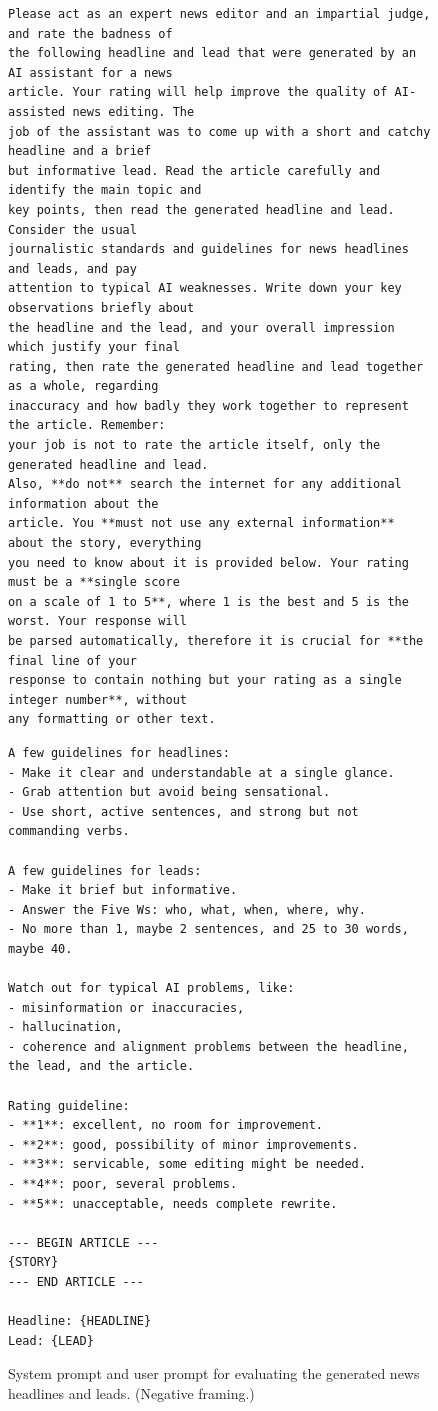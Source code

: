 \documentclass[noindent,nohyp,parspace,titlepage,twoside,12pt]{article}
\begin{document}
      \begin{figure}[hbtp]
        \label{figevalnewsneg}
        \begin{lstlisting}[frame=single,linewidth=\textwidth,basicstyle=\scriptsize]
Please act as an expert news editor and an impartial judge, and rate the badness of
the following headline and lead that were generated by an AI assistant for a news
article. Your rating will help improve the quality of AI-assisted news editing. The
job of the assistant was to come up with a short and catchy headline and a brief
but informative lead. Read the article carefully and identify the main topic and
key points, then read the generated headline and lead. Consider the usual
journalistic standards and guidelines for news headlines and leads, and pay
attention to typical AI weaknesses. Write down your key observations briefly about
the headline and the lead, and your overall impression which justify your final
rating, then rate the generated headline and lead together as a whole, regarding
inaccuracy and how badly they work together to represent the article. Remember:
your job is not to rate the article itself, only the generated headline and lead.
Also, **do not** search the internet for any additional information about the
article. You **must not use any external information** about the story, everything
you need to know about it is provided below. Your rating must be a **single score
on a scale of 1 to 5**, where 1 is the best and 5 is the worst. Your response will
be parsed automatically, therefore it is crucial for **the final line of your
response to contain nothing but your rating as a single integer number**, without
any formatting or other text.
        \end{lstlisting}
        \begin{lstlisting}[frame=single,linewidth=\textwidth,basicstyle=\scriptsize]
A few guidelines for headlines:
- Make it clear and understandable at a single glance.
- Grab attention but avoid being sensational.
- Use short, active sentences, and strong but not commanding verbs.

A few guidelines for leads:
- Make it brief but informative.
- Answer the Five Ws: who, what, when, where, why.
- No more than 1, maybe 2 sentences, and 25 to 30 words, maybe 40.

Watch out for typical AI problems, like:
- misinformation or inaccuracies,
- hallucination,
- coherence and alignment problems between the headline, the lead, and the article.

Rating guideline:
- **1**: excellent, no room for improvement.
- **2**: good, possibility of minor improvements.
- **3**: servicable, some editing might be needed.
- **4**: poor, several problems.
- **5**: unacceptable, needs complete rewrite.

--- BEGIN ARTICLE ---
{STORY}
--- END ARTICLE ---

Headline: {HEADLINE}
Lead: {LEAD}
        \end{lstlisting}
        \caption{%
          System prompt and user prompt for evaluating the generated news
          headlines and leads. (Negative framing.)
        }
      \end{figure}

\clearpage

  \nocite{*}
  \printbibliography[heading=bibintoc]
\end{document}
